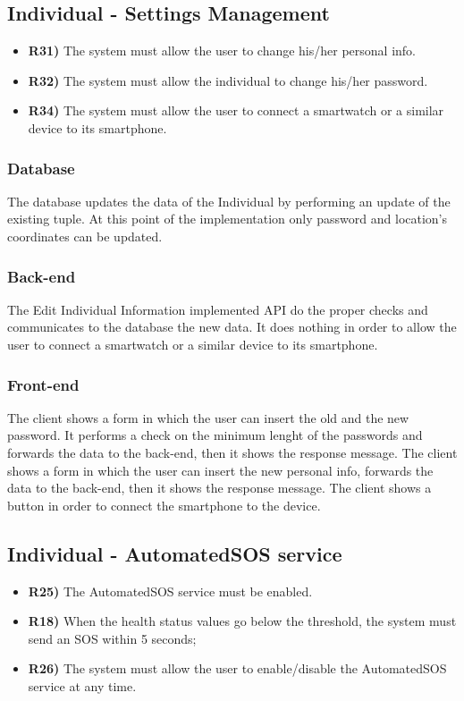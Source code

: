 \subsection{Individual - Settings Management}
\begin{itemize}	
	\item {\color{Red}\textbf{R31)}} The system must allow the user to change his/her personal info.
	\item {\color{Green}\textbf{R32)}} The system must allow the individual to change his/her password.
	\item {\color{Red}\textbf{R34)}} The system must allow the user to connect a smartwatch or a similar device to its smartphone.
\end{itemize}
\subsubsection*{Database}
The database updates the data of the Individual by performing an update of the existing tuple. At this point of the implementation only password and location's coordinates can be updated. 

\subsubsection*{Back-end}
The Edit Individual Information implemented API do the proper checks and communicates to the database the new data. It does nothing in order to allow the user to connect a smartwatch or a similar device to its smartphone.

\subsubsection*{Front-end}
The client shows a form in which the user can insert the old and the new password. It performs a check on the minimum lenght of the passwords and forwards the data to the back-end, then it shows the response message. 
The client shows a form in which the user can insert the new personal info, forwards the data to the back-end, then it shows the response message. 
The client shows a button in order to connect the smartphone to the device.


\subsection{Individual - AutomatedSOS service}
\begin{itemize}	
	\item {\color{Green}\textbf{R25)}} The AutomatedSOS service must be enabled.
	\item {\color{Green}\textbf{R18)}} When the health status values go below the threshold, the system must send an SOS within 5 seconds;
	\item {\color{Green}\textbf{R26)}} The system must allow the user to enable/disable the AutomatedSOS service at any time.
\end{itemize}

